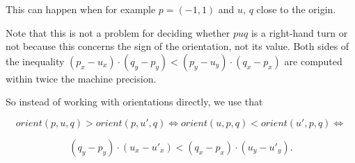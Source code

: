This can happen when for example $p = (-1, 1)$ and $u$, $q$ close to
the origin.

Note that this is not a problem for deciding whether $puq$ is a
right-hand turn or not because this concerns the sign of the orientation,
not its value. Both sides of the inequality
$(p_x - u_x) \cdot (q_y - p_y) < (p_y - u_y) \cdot (q_x - p_x)$ are
computed within twice the machine precision.

So instead of working with orientations directly, we use that

$$orient(p, u, q) > orient(p, u', q) \iff orient(u, p, q) < orient(u', p, q) 
\iff$$

$$(q_y - p_y) \cdot (u_x - u'_x) < (q_x - p_x) \cdot (u_y - u'_y).$$
